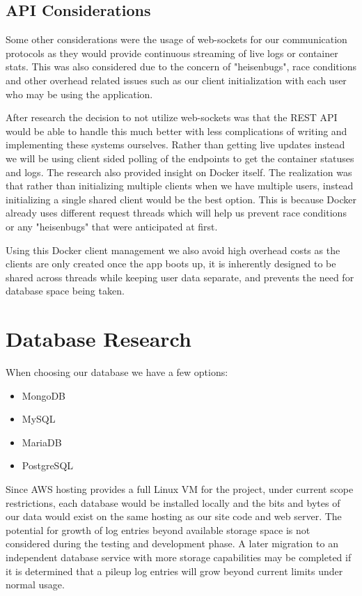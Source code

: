\documentclass[12pt,titlepage]{article}
\begin{document}
\subsection{API Considerations} \label{subsec:api-considerations}
Some other considerations were the usage of web-sockets for our communication protocols as they would provide continuous streaming of live logs or container stats. This was also considered due to the concern of "heisenbugs", race conditions and other overhead related issues such as our client initialization with each user who may be using the application.

After research the decision to not utilize web-sockets was that the REST API would be able to handle this much better with less complications of writing and implementing these systems ourselves. Rather than getting live updates instead we will be using client sided polling of the endpoints to get the container statuses and logs. The research also provided insight on Docker itself. The realization was that rather than initializing multiple clients when we have multiple users, instead initializing a single shared client would be the best option. This is because Docker already uses different request threads which will help us prevent race conditions or any "heisenbugs" that were anticipated at first.

Using this Docker client management we also avoid high overhead costs as the clients are only created once the app boots up, it is inherently designed to be shared across threads while keeping user data separate, and prevents the need for database space being taken.

\section{Database Research}
When choosing our database we have a few options:
\begin{itemize}
	\item MongoDB
	\item MySQL
	\item MariaDB
	\item PostgreSQL
\end{itemize}

Since AWS hosting provides a full Linux VM for the project, under current scope restrictions, each database would be installed locally
and the bits and bytes of our data would exist on the same hosting as our site code and web server. The potential for growth of log entries
beyond available storage space is not considered during the testing and development phase. A later migration to an independent database service
with more storage capabilities may be completed if it is determined that a pileup log entries will grow beyond current limits under normal usage.
\end{document}
